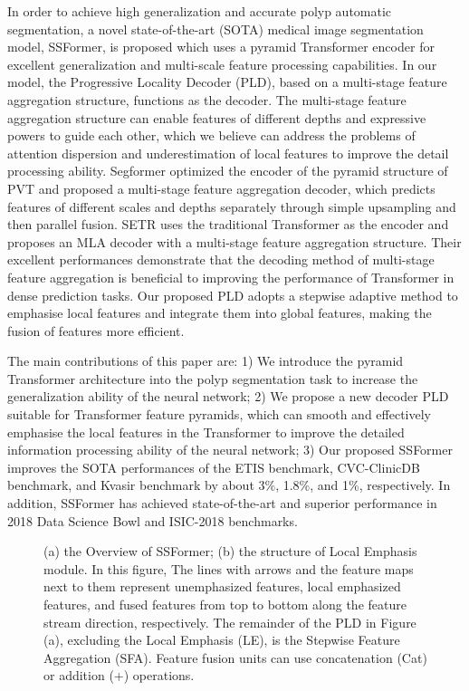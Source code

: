 \documentclass[runningheads]{llncs}
\begin{document}
In order to achieve high generalization and accurate polyp automatic segmentation, a novel state-of-the-art (SOTA) medical image segmentation model, SSFormer, is proposed which uses a pyramid Transformer encoder \cite{pvtv1,xie2021segformer,pvtv2,simvit} for excellent generalization and multi-scale feature processing capabilities. In our model, the Progressive Locality Decoder (PLD), based on a multi-stage feature aggregation structure, functions as the decoder. The multi-stage feature aggregation structure can enable features of different depths and expressive powers to guide each other, which we believe can address the problems of attention dispersion and underestimation of local features to improve the detail processing ability. Segformer \cite{xie2021segformer} optimized the encoder of the pyramid structure of PVT \cite{pvtv1} and proposed a multi-stage feature aggregation decoder, which predicts features of different scales and depths separately through simple upsampling and then parallel fusion. SETR \cite{zheng2021rethinking} uses the traditional Transformer as the encoder and proposes an MLA decoder with a multi-stage feature aggregation structure. Their excellent performances demonstrate that the decoding method of multi-stage feature aggregation is beneficial to improving the performance of Transformer in dense prediction tasks. Our proposed PLD adopts a stepwise adaptive method to emphasise local features and integrate them into global features, making the fusion of features more efficient.

The main contributions of this paper are: 1) We introduce the pyramid Transformer architecture into the polyp segmentation task to increase the generalization ability of the neural network; 2) We propose a new decoder PLD suitable for Transformer feature pyramids, which can smooth and effectively emphasise the local features in the Transformer to improve the detailed information processing ability of the neural network; 3) Our proposed SSFormer improves the SOTA performances of the ETIS benchmark, CVC-ClinicDB benchmark, and Kvasir benchmark by about 3\%, 1.8\%, and 1\%, respectively.  In addition, SSFormer has achieved state-of-the-art and superior performance in 2018 Data Science Bowl and ISIC-2018 benchmarks.

\begin{figure}[t]

\centering
{}
\quad
{}
\caption{(a) the Overview of SSFormer; (b) the structure of Local Emphasis module. In this figure, The lines with arrows and the feature maps next to them represent unemphasized features, local emphasized features, and fused features from top to bottom along the feature stream direction, respectively. The remainder of the PLD in Figure (a), excluding the Local Emphasis (LE), is the Stepwise Feature Aggregation (SFA). Feature fusion units can use concatenation (Cat) or addition (+) operations. }
\end{figure}
\end{document}
